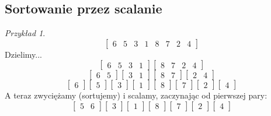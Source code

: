 \documentclass[10pt, oneside]{article}
\theoremstyle{remark}
\newtheorem*{example}{Przykład}
\begin{document}
\subsection{Sortowanie przez scalanie}

\begin{example}

$$\begin{bmatrix}
	6 & 5 & 3 & 1 & 8 & 7 & 2 & 4
\end{bmatrix}$$
Dzielimy...
$$\begin{bmatrix}
	6 & 5 & 3 & 1 \end{bmatrix} \begin{bmatrix} 8 & 7 & 2 & 4
\end{bmatrix}$$
$$\begin{bmatrix}
	6 & 5 \end{bmatrix} \begin{bmatrix} 3 & 1 \end{bmatrix} \begin{bmatrix} 8 & 7 \end{bmatrix} \begin{bmatrix} 2 & 4
\end{bmatrix}$$
$$\begin{bmatrix}
	6 \end{bmatrix} \begin{bmatrix} 5 \end{bmatrix} \begin{bmatrix} 3 \end{bmatrix} \begin{bmatrix} 1 \end{bmatrix} \begin{bmatrix} 8 \end{bmatrix} \begin{bmatrix} 7 \end{bmatrix} \begin{bmatrix} 2 \end{bmatrix} \begin{bmatrix} 4
\end{bmatrix}$$
A teraz zwyciężamy (sortujemy) i scalamy, zaczynając od pierwszej pary:
$$\begin{bmatrix}
	5 & 6 \end{bmatrix} \begin{bmatrix} 3 \end{bmatrix} \begin{bmatrix} 1 \end{bmatrix} \begin{bmatrix} 8 \end{bmatrix} \begin{bmatrix} 7 \end{bmatrix} \begin{bmatrix} 2 \end{bmatrix} \begin{bmatrix} 4

\end{bmatrix}$$
\end{example}
\end{document}
